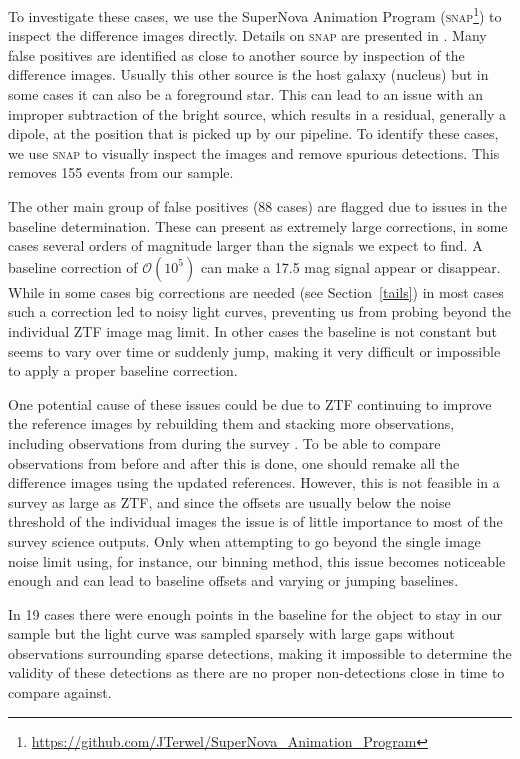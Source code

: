 \documentclass[a4paper,oneside,12pt, class=Latex/Classes/PhDthesisPSnPDF, crop=false]{standalone}
\begin{document}
To investigate these cases, we use the SuperNova Animation Program (\textsc{snap}\footnote{\url{https://github.com/JTerwel/SuperNova_Animation_Program}}) to inspect the difference images directly. Details on \textsc{snap} are presented in \citet{Terwel_2024_paper1}. Many false positives are identified as close to another source by inspection of the difference images. Usually this other source is the host galaxy (nucleus) but in some cases it can also be a foreground star. This can lead to an issue with an improper subtraction of the bright source, which results in a residual, generally a dipole, at the position that is picked up by our pipeline. To identify these cases, we use \textsc{snap} to visually inspect the images and remove spurious detections. This removes 155  events from our sample. 

The other main group of false positives (88 cases) are flagged due to issues in the baseline determination. These can present as extremely large corrections, in some cases several orders of magnitude larger than the signals we expect to find. A baseline correction of $\mathcal{O}(10^5)$ can make a 17.5 mag signal appear or disappear. While in some cases big corrections are needed (see Section~\ref{tails}) in most cases such a correction led to noisy light curves, preventing us from probing beyond the individual ZTF image mag limit. In other cases the baseline is not constant but seems to vary over time or suddenly jump, making it very difficult or impossible to apply a proper baseline correction.

One potential cause of these issues could be due to ZTF continuing to improve the reference images by rebuilding them and stacking more observations, including observations from during the survey \citep{ZTF_Instrumentation}. To be able to compare observations from before and after this is done, one should remake all the difference images using the updated references. However, this is not feasible in a survey as large as ZTF, and since the offsets are usually below the noise threshold of the individual images the issue is of little importance to most of the survey science outputs. Only when attempting to go beyond the single image noise limit using, for instance, our binning method, this issue becomes noticeable enough and can lead to baseline offsets and varying or jumping baselines.

In 19 cases there were enough points in the baseline for the object to stay in our sample but the light curve was sampled sparsely with large gaps without observations surrounding sparse detections, making it impossible to determine the validity of these detections as there are no proper non-detections close in time to compare against.
\end{document}
